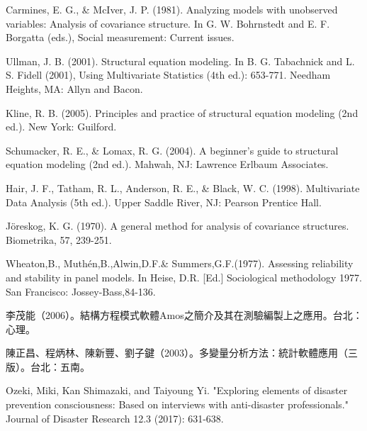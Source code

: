 \documentclass[letterpaper,12pt,titlepage,oneside,final,a4j,dvipdfmx]{book}
\begin{document}
\begin{thebibliography}{50}
 Carmines, E. G., \& McIver, J. P. (1981). Analyzing models with unobserved variables: Analysis of covariance structure. In G. W. Bohrnstedt and E. F. Borgatta (eds.), Social measurement: Current issues.

 Ullman, J. B. (2001). Structural equation modeling. In B. G. Tabachnick and L. S. Fidell (2001), Using Multivariate Statistics (4th ed.): 653-771. Needham Heights, MA: Allyn and Bacon.

 Kline, R. B. (2005). Principles and practice of structural equation modeling (2nd ed.). New York: Guilford.

 Schumacker, R. E., \& Lomax, R. G. (2004). A beginner's guide to structural equation modeling (2nd ed.). Mahwah, NJ: Lawrence Erlbaum Associates.

 Hair, J. F., Tatham, R. L., Anderson, R. E., \& Black, W. C. (1998). Multivariate Data Analysis (5th ed.). Upper Saddle River, NJ: Pearson Prentice Hall.

 Jöreskog, K. G. (1970). A general method for analysis of covariance structures. Biometrika, 57, 239-251.

 Wheaton,B., Muthén,B.,Alwin,D.F.\& Summers,G.F.(1977). Assessing reliability and stability in panel models. In Heise, D.R. [Ed.] Sociological methodology 1977. San Francisco: Jossey-Bass,84-136.

 李茂能（2006）。結構方程模式軟體Amos之簡介及其在測驗編製上之應用。台北：心理。

 陳正昌、程炳林、陳新豐、劉子鍵（2003）。多變量分析方法：統計軟體應用（三版）。台北：五南。

 Ozeki, Miki, Kan Shimazaki, and Taiyoung Yi. "Exploring elements of disaster prevention consciousness: Based on interviews with anti-disaster professionals." Journal of Disaster Research 12.3 (2017): 631-638.
\end{thebibliography}

\end{document}

